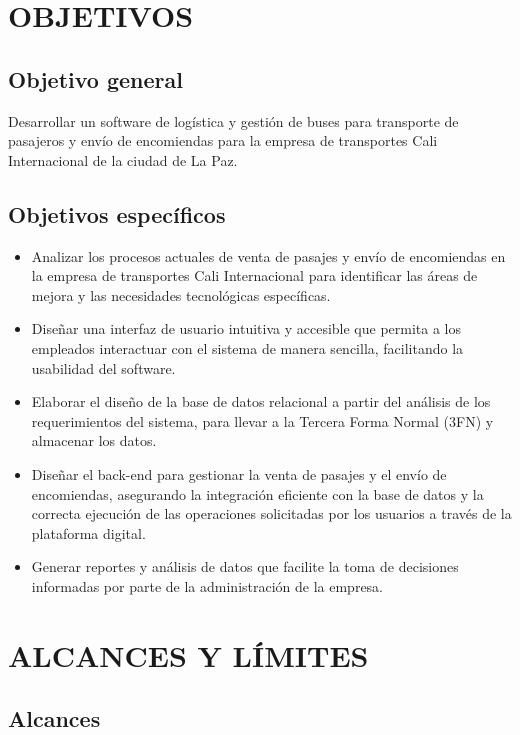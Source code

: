 \section{OBJETIVOS}
	\subsection{Objetivo general}
	
		Desarrollar un software de logística y gestión de buses para transporte de pasajeros y envío de encomiendas para la empresa de transportes Cali Internacional de la ciudad de La Paz.
		
	\subsection{Objetivos específicos}
	
		\begin{itemize}[label=$\bullet$, left=0cm, labelsep = 1.05cm, topsep = 0pt, parsep = 0pt]
			
			\item Analizar los procesos actuales de venta de pasajes y envío de encomiendas en la empresa de transportes Cali Internacional para identificar las áreas de mejora y las necesidades tecnológicas específicas.
			\item Diseñar una interfaz de usuario intuitiva y accesible que permita a los empleados interactuar con el sistema de manera sencilla, facilitando la usabilidad del software.
			\item Elaborar el diseño de la base de datos relacional a partir del análisis de los requerimientos del sistema, para llevar a la Tercera Forma Normal (3FN) y almacenar los datos.
			\item Diseñar el back-end para gestionar la venta de pasajes y el envío de encomiendas, asegurando la integración eficiente con la base de datos y la correcta ejecución de las operaciones solicitadas por los usuarios a través de la plataforma digital.    
			\item Generar reportes y análisis de datos que facilite la toma de decisiones informadas por parte de la administración de la empresa.
			
		\end{itemize}
		
\section{ALCANCES Y LÍMITES}
	\subsection{Alcances}
		
